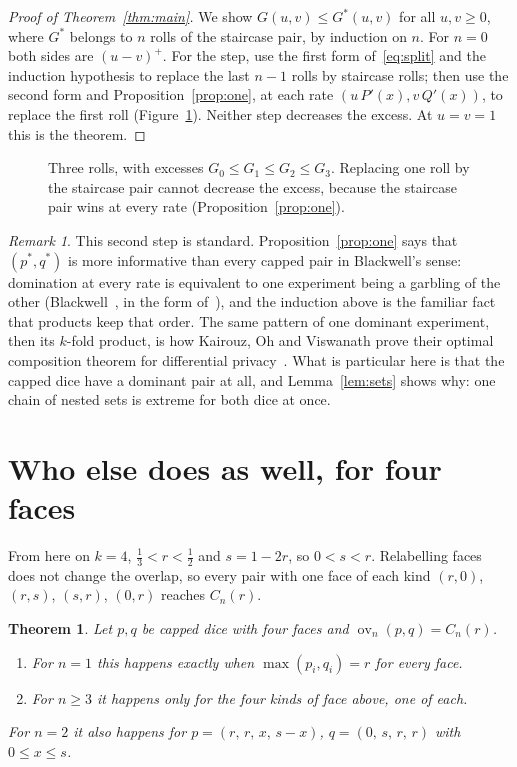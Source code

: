 \documentclass[11pt]{article}
\newtheorem{theorem}{Theorem}
\theoremstyle{remark}
\newtheorem*{remark}{Remark}
\newcommand{\ov}{\operatorname{ov}}
\begin{document}
\begin{proof}[Proof of Theorem~\ref{thm:main}]
We show $G(u,v)\le G^*(u,v)$ for all $u,v\ge0$, where $G^*$ belongs to $n$ rolls of the staircase pair, by
induction on $n$. For $n=0$ both sides are $(u-v)^+$. For the step, use the first form of~\eqref{eq:split}
and the induction hypothesis to replace the last $n-1$ rolls by staircase rolls; then use the second form and
Proposition~\ref{prop:one}, at each rate $(u\,P'(x),v\,Q'(x))$, to replace the first roll
(Figure~\ref{fig:rolls}). Neither step decreases the excess. At $u=v=1$ this is the theorem.
\end{proof}

\begin{figure}[ht]
\centering

\caption{Three rolls, with excesses $G_0\le G_1\le G_2\le G_3$. Replacing one roll by the staircase pair cannot
decrease the excess, because the staircase pair wins at every rate (Proposition~\ref{prop:one}).}
\label{fig:rolls}
\end{figure}

\begin{remark}
This second step is standard. Proposition~\ref{prop:one} says that $(p^*,q^*)$ is more informative than
every capped pair in Blackwell's sense: domination at every rate is equivalent to one experiment being a
garbling of the other (Blackwell~\cite[Theorem~10]{Bla53}, in the form of~\cite[Theorem~2.5]{KOV15}), and the
induction above is the familiar fact that products keep that order. The same
pattern of one dominant experiment, then its $k$-fold product, is how Kairouz, Oh and Viswanath prove their
optimal composition theorem for differential privacy~\cite[Section~3.1]{KOV15}. What is particular here is
that the capped dice have a dominant pair at all, and Lemma~\ref{lem:sets} shows why: one chain of nested
sets is extreme for both dice at once.
\end{remark}

\section{Who else does as well, for four faces}

From here on $k=4$, $\frac13<r<\frac12$ and $s=1-2r$, so $0<s<r$. Relabelling faces does not change the
overlap, so every pair with one face of each kind $(r,0)$, $(r,s)$, $(s,r)$, $(0,r)$ reaches $C_n(r)$.

\begin{theorem}\label{thm:eq}
Let $p,q$ be capped dice with four faces and $\ov_n(p,q)=C_n(r)$.
\begin{enumerate}
\item[(a)] For $n=1$ this happens exactly when $\max(p_i,q_i)=r$ for every face.
\item[(b)] For $n\ge3$ it happens only for the four kinds of face above, one of each.
\end{enumerate}
For $n=2$ it also happens for $p=(r,\,r,\,x,\,s-x)$, $q=(0,\,s,\,r,\,r)$ with $0\le x\le s$.
\end{theorem}
\end{document}
